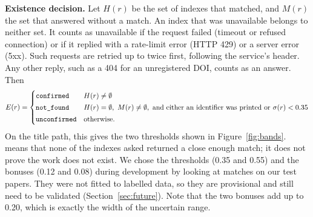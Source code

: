 \documentclass{article}
\newcommand{\vd}[1]{\texttt{\detokenize{#1}}}
\begin{document}
\textbf{Existence decision.} Let $H(r)$ be the set of indexes that matched, and $M(r)$ the set that answered without a match. An index that was unavailable belongs to neither set. It counts as unavailable if the request failed (timeout or refused connection) or if it replied with a rate-limit error (HTTP 429) or a server error (5xx). Such requests are retried up to twice first, following the service's \vd{Retry-After} header. Any other reply, such as a 404 for an unregistered DOI, counts as an answer. Then
\begin{equation}
E(r) =
\begin{cases}
\vd{confirmed} & H(r) \neq \emptyset\\[2pt]
\vd{not_found} & H(r) = \emptyset,\ M(r) \neq \emptyset, \text{ and either an identifier was printed or } \sigma(r) < 0.35\\[2pt]
\vd{unconfirmed} & \text{otherwise.}
\end{cases}
\label{eq:exist}
\end{equation}
On the title path, this gives the two thresholds shown in Figure~\ref{fig:bands}. \vd{not_found} means that none of the indexes asked returned a close enough match; it does not prove the work does not exist. We chose the thresholds (0.35 and 0.55) and the bonuses (0.12 and 0.08) during development by looking at matches on our test papers. They were not fitted to labelled data, so they are provisional and still need to be validated (Section~\ref{sec:future}). Note that the two bonuses add up to 0.20, which is exactly the width of the uncertain range.
\end{document}
